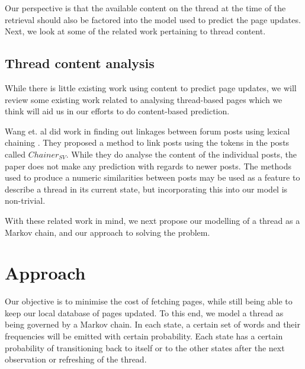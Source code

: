\documentclass[12 pt]{article}
\begin{document}
Our perspective is that the available content on the thread at the time of the retrieval should also be factored into the model used to predict the page updates. Next, we look at some of the related work pertaining to thread content.

\subsection{Thread content analysis}
While there is little existing work using content to predict page updates, we will review some existing work related to analysing thread-based pages which we think will aid us in our efforts to do content-based prediction.

Wang et. al did work in finding out linkages between forum posts using lexical chaining \cite{Wang2011}. They proposed a method to link posts using the tokens in the posts called $Chainer_{SV}$. While they do analyse the content of the individual posts, the paper does not make any prediction with regards to newer posts. The methods used to produce a numeric similarities between posts may be used as a feature to describe a thread in its current state, but incorporating this into our model is non-trivial.




With these related work in mind, we next propose our modelling of a thread as a Markov chain, and our approach to solving the problem.

\section{Approach}
Our objective is to minimise the cost of fetching pages, while still being able to keep our local database of pages updated. To this end, we model a thread as being governed by a Markov chain. In each state, a certain set of words and their frequencies will be emitted with certain probability. Each state has a certain probability of transitioning back to itself or to the other states after the next observation or refreshing of the thread.
\end{document}
